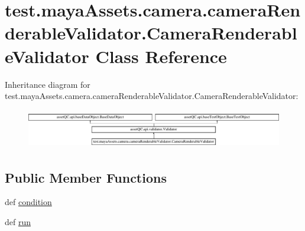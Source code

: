 \hypertarget{classtest_1_1mayaAssets_1_1camera_1_1cameraRenderableValidator_1_1CameraRenderableValidator}{\section{test.\-maya\-Assets.\-camera.\-camera\-Renderable\-Validator.\-Camera\-Renderable\-Validator \-Class \-Reference}
\label{d2/d2c/classtest_1_1mayaAssets_1_1camera_1_1cameraRenderableValidator_1_1CameraRenderableValidator}
}
\-Inheritance diagram for test.\-maya\-Assets.\-camera.\-camera\-Renderable\-Validator.\-Camera\-Renderable\-Validator\-:\begin{figure}[H]
\begin{center}
\leavevmode
\includegraphics[height=1.742738cm]{d2/d2c/classtest_1_1mayaAssets_1_1camera_1_1cameraRenderableValidator_1_1CameraRenderableValidator}
\end{center}
\end{figure}
\subsection*{\-Public \-Member \-Functions}
\begin{DoxyCompactItemize}
\item 
def \hyperlink{classtest_1_1mayaAssets_1_1camera_1_1cameraRenderableValidator_1_1CameraRenderableValidator_a9022adf4a8959d8b9ab64cf28740415f}{condition}
\item 
def \hyperlink{classtest_1_1mayaAssets_1_1camera_1_1cameraRenderableValidator_1_1CameraRenderableValidator_a28e8ab5b5228a35f643bdf1b8d04409e}{run}
\end{DoxyCompactItemize}
